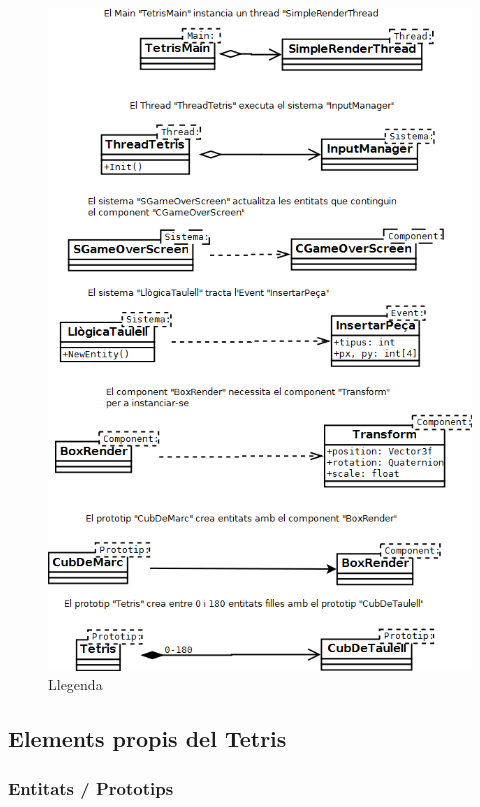   \begin{figure}
    \includegraphics[width=1\linewidth]{./img/GuiaDiagramaQuadriga.png}
    \caption{Llegenda \label{fig:GuiaDiagramaQuadriga}}
  \end{figure}

  \subsection{Elements propis del Tetris}

    \subsubsection{Entitats / Prototips}

